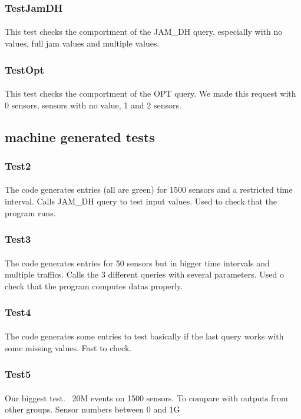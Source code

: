 \subsubsection{TestJamDH}
\paragraph{}
This test checks the comportment of the JAM\_DH query, especially with no values, full jam values and multiple values.

\subsubsection{TestOpt}
\paragraph{}
This test checks the comportment of the OPT query. We made this request with 0 sensors, sensors with no value, 1 and 2 sensors.


\subsection{machine generated tests}

\subsubsection{Test2}
\paragraph{}
The code generates entries (all are green) for 1500 sensors and a restricted time interval. Calls JAM\_DH query to test input values. Used to check that the program runs.

\subsubsection{Test3}
\paragraph{}
The code generates entries for 50 sensors but in bigger time intervals and multiple traffics. Calls the 3 different queries with several parameters. Used o check that the program computes datas properly.

\subsubsection{Test4}
\paragraph{}
The code generates some entries to test basically if the last query works with some missing values. Fast to check.

\subsubsection{Test5}
\paragraph{}
Our biggest test. ~20M events on 1500 sensors. To compare with outputs from other groups. Sensor numbers between 0 and 1G
